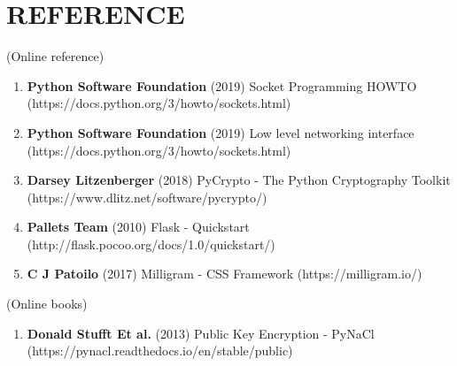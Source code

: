 \chapter*{\rm \large \bf REFERENCE}
\vspace{4.0mm}
\setlength{\parindent}{1cm} 

\scriptsize{(Online reference)}
\begin{enumerate}
    \item \textbf{Python Software Foundation} (2019) Socket Programming HOWTO
        (https://docs.python.org/3/howto/sockets.html)

    \item \textbf{Python Software Foundation} (2019) Low level networking
        interface (https://docs.python.org/3/howto/sockets.html)

    \item \textbf{Darsey Litzenberger} (2018) PyCrypto - The Python Cryptography
        Toolkit (https://www.dlitz.net/software/pycrypto/)

    \item \textbf{Pallets Team} (2010) Flask - Quickstart
        (http://flask.pocoo.org/docs/1.0/quickstart/)

    \item \textbf{C J Patoilo} (2017) Milligram - CSS Framework
        (https://milligram.io/)
\end{enumerate}

\scriptsize{(Online books)}
\begin{enumerate}
    \item \textbf{Donald Stufft Et al.} (2013) Public Key Encryption - PyNaCl
        (https://pynacl.readthedocs.io/en/stable/public)
\end{enumerate}

\newpage
